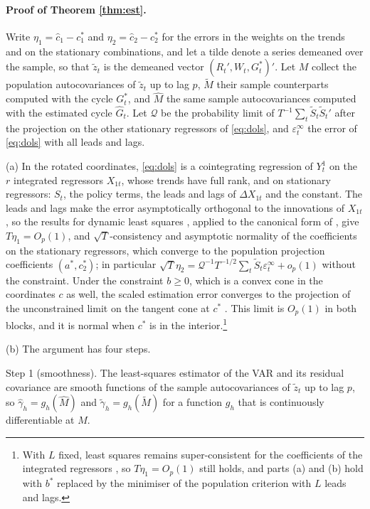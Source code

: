 \documentclass[12pt,a4paper]{article}
\theoremstyle{definition}
\theoremstyle{definition}\newtheorem{example}{Example}
\theoremstyle{definition}\newtheorem{definition}{Definition}
\begin{document}
\paragraph{Proof of Theorem \ref{thm:est}.} Write $\eta_1=\hat c_1-c_1^\ast$ and $\eta_2=\hat c_2-c_2^\ast$ for the errors in the weights on the trends and on the stationary combinations, and let a tilde denote a series demeaned over the sample, so that $\tilde z_t$ is the demeaned vector $(R_t',W_t,G^\ast_t)'$. Let $M$ collect the population autocovariances of $\tilde z_t$ up to lag $p$, $\tilde M$ their sample counterparts computed with the cycle $G^\ast_t$, and $\hat M$ the same sample autocovariances computed with the estimated cycle $\hat G_t$. Let $\mathcal Q$ be the probability limit of $T^{-1}\sum_t\tilde S_t\tilde S_t'$ after the projection on the other stationary regressors of \eqref{eq:dols}, and $\varepsilon^\infty_t$ the error of \eqref{eq:dols} with all leads and lags.

(a) In the rotated coordinates, \eqref{eq:dols} is a cointegrating regression of $Y^1_t$ on the $r$ integrated regressors $X_{1t}$, whose trends have full rank, and on stationary regressors: $S_t$, the policy terms, the leads and lags of $\Delta X_{1t}$ and the constant. The leads and lags make the error asymptotically orthogonal to the innovations of $X_{1t}$, so the results for dynamic least squares \citep{Saikkonen1991,StockWatson1993}, applied to the canonical form of \citet{SimsStockWatson1990}, give $T\eta_1=O_p(1)$, and $\sqrt{T}$-consistency and asymptotic normality of the coefficients on the stationary regressors, which converge to the population projection coefficients $(a^\ast,c_2^\ast)$; in particular $\sqrt{T}\eta_2=\mathcal Q^{-1}T^{-1/2}\sum_t\tilde S_t\varepsilon^\infty_t+o_p(1)$ without the constraint. Under the constraint $b\geq0$, which is a convex cone in the coordinates $c$ as well, the scaled estimation error converges to the projection of the unconstrained limit on the tangent cone at $c^\ast$ \citep{Andrews1999}. This limit is $O_p(1)$ in both blocks, and it is normal when $c^\ast$ is in the interior.\footnote{With $L$ fixed, least squares remains super-consistent for the coefficients of the integrated regressors \citep{Stock1987}, so $T\eta_1=O_p(1)$ still holds, and parts (a) and (b) hold with $b^\ast$ replaced by the minimiser of the population criterion with $L$ leads and lags.}

(b) The argument has four steps.

Step 1 (smoothness). The least-squares estimator of the VAR and its residual covariance are smooth functions of the sample autocovariances of $\tilde z_t$ up to lag $p$, so $\hat\gamma_h=g_h(\hat M)$ and $\tilde\gamma_h=g_h(\tilde M)$ for a function $g_h$ that is continuously differentiable at $M$.
\end{document}

